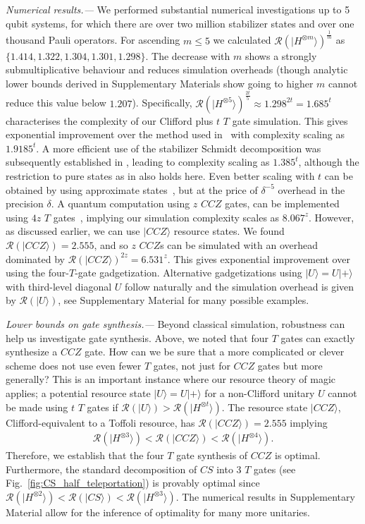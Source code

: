 \documentclass[aps,prl,twocolumn,showpacs,superscriptaddress,groupedaddress,amsmath,amssymb]{revtex4-1}  %
\def\ket #1{\vert #1\rangle}
\begin{document}
\noindent\textit{Numerical results.---} We performed substantial numerical investigations up to 5 qubit systems, for which there are over two million stabilizer states and over one thousand Pauli operators. For ascending $m\leq 5$ we calculated $\mathcal{R}(\ket{H^{\otimes m}})^{\frac{1}{m}}$ as $\{ 1.414, 1.322, 1.304, 1.301, 1.298 \}$.  The decrease with $m$ shows a strongly submultiplicative behaviour and reduces simulation overheads (though analytic lower bounds derived in Supplementary Materials show going to higher $m$ cannot reduce this value below $1.207$).  Specifically,  $\mathcal{R}(\ket{H^{\otimes 5}})^{\frac{2t}{5}} \approx 1.298^{2t} = 1.685^t$ characterises the complexity of our Clifford plus $t$ $T$ gate simulation. This gives exponential improvement over the method used in~\cite{bravyi_trading_2016} with complexity scaling as $1.9185^t$. A more efficient use of the stabilizer Schmidt decomposition was subsequently established in \cite{bravyi_improved_2016}, leading to complexity scaling as $1.385^t$, although the restriction to pure states as in \cite{bravyi_trading_2016} also holds here. Even better scaling with $t$ can be obtained by using approximate states~\cite{bravyi_improved_2016}, but at the price of $\delta^{-5}$ overhead in the precision $\delta$.  A quantum computation using $z$ $CCZ$ gates, can be implemented using $4z$ $T$ gates~\cite{jones_low-overhead_2013}, implying our simulation complexity scales as $8.067^z$.  However, as discussed earlier, we can use $\ket{CCZ}$ resource states.  We found $\mathcal{R}(\ket{CCZ})=2.555$, and so $z$ $CCZ$s can be simulated with an overhead dominated by $\mathcal{R}(\ket{CCZ})^{2z}=6.531^z$. This gives exponential improvement over using the four-$T$-gate gadgetization. Alternative gadgetizations using $\ket{U}=U\ket{+}$ with third-level diagonal $U$ follow naturally and the simulation overhead is given by $\mathcal{R}(\ket{U})$, see Supplementary Material for many possible examples.

\noindent\textit{Lower bounds on gate synthesis.---} Beyond classical simulation, robustness can help us investigate gate synthesis.  Above, we noted that four $T$ gates can exactly synthesize a $CCZ$ gate.  How can we be sure that a more complicated or clever scheme does not use even fewer $T$ gates, not just for $CCZ$ gates but more generally? This is an important instance where our resource theory of magic applies; a potential resource state $\ket{U}=U\ket{+}$ for a non-Clifford unitary $U$ cannot be made using $t$ $T$ gates if $\mathcal{R}(\ket{U})>\mathcal{R}(\ket{H^{\otimes t}})$. The resource state $\ket{CCZ}$, Clifford-equivalent to a Toffoli resource, has $\mathcal{R}(\ket{CCZ})=2.555$ implying
\begin{align}
\mathcal{R}(\ket{H^{\otimes 3}})<\mathcal{R}(\ket{CCZ})<\mathcal{R}(\ket{H^{\otimes 4}}) .
\end{align}
Therefore, we establish that the four $T$ gate synthesis of $CCZ$ is optimal.  Furthermore, the standard decomposition of $CS$ into 3 $T$ gates (see Fig.~\ref{fig:CS_half_teleportation}) is provably optimal since $\mathcal{R}(\ket{H^{\otimes 2}})<\mathcal{R}(\ket{CS})<\mathcal{R}(\ket{H^{\otimes 3}})$. The numerical results in Supplementary Material allow for the inference of optimality for many more unitaries.
\end{document}
